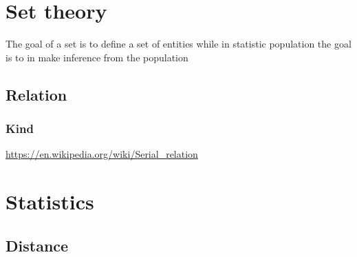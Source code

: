 \documentclass{book}
\begin{document}
\section{Set theory}


The goal of a set is to define a set of  entities while in statistic population the goal is to in make inference from the population

\subsection{Relation}

\subsubsection{Kind}


\url{https://en.wikipedia.org/wiki/Serial_relation}


% 


% 

\section{Statistics}

\subsection{Distance}

\end{document}

